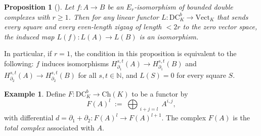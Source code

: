 \documentclass[11pt]{amsart}
\numberwithin{equation}{section}
\theoremstyle{plain}
\newtheorem{Pro}[thm]{Proposition}
\theoremstyle{definition}
\newtheorem{Ex}[thm]{Example}
\begin{document}
\begin{Pro}[{\!\cite[Proposition~12]{S1}}]\label{prop-double-complex-functor}
Let $f:A\longrightarrow B$ be an $E_r$-isomorphism of bounded double
complexes with $r\geq1$.
Then for any linear functor
$L:\mathrm{DC}_K^b\longrightarrow\mathrm{Vect}_K$
that sends every square and every even-length zigzag of length \(< 2r\) to the zero vector space,
the induced map $L(f):L(A)\longrightarrow L(B)$ is an isomorphism.
\end{Pro}

In particular, if $r=1$, the condition in this proposition is equivalent to
the following: $f$ induces isomorphisms
$H_{\partial_1}^{s,t}(A)\to H_{\partial_1}^{s,t}(B)$ and
$H_{\partial_2}^{s,t}(A)\to H_{\partial_2}^{s,t}(B)$ for all
$s,t\in\mathbb N$, and $L(S)=0$ for every square $S$.

\begin{Ex}\label{ex-total-complex}\normalfont
Define $F: \mathrm{DC}_{K}^{b}\longrightarrow \mathrm{Ch}(K)$ to be a functor by
\[
F(A)^l \;:=\; \bigoplus_{\substack{i+j=l}} A^{i,j},
\]
with differential \(d= \partial_1+\partial_2: F(A)^l \to F(A)^{l+1}\).
The complex $F(A)$ is the \emph{total complex} associated with $A$.
\end{Ex}
\end{document}
